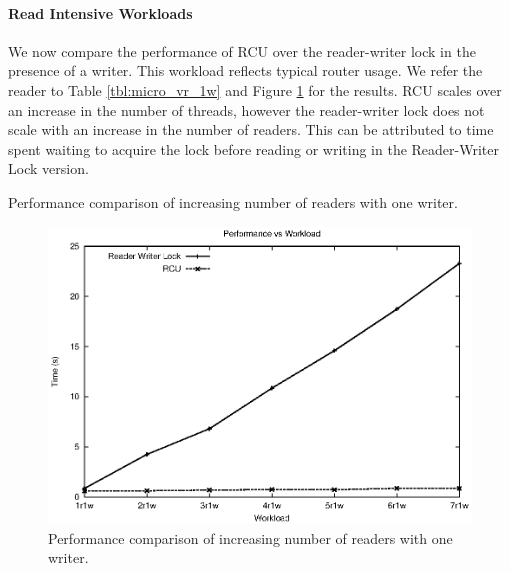 \documentclass[a4paper]{article}
\begin{document}
\paragraph{Read Intensive Workloads}
We now compare the performance of RCU over the reader-writer lock in the presence of a writer. This workload reflects typical router usage. We refer the reader to Table \ref{tbl:micro_vr_1w} and Figure \ref{img:micro_vr_1w} for the results.
RCU scales over an increase in the number of threads, however the reader-writer lock does not scale with an increase in the number of readers. This can be attributed to time spent waiting to acquire the lock before reading or writing in the Reader-Writer Lock version.

\begin{table}[tph]
\begin{center}

\end{center}
\label{tbl:micro_vr_1w}
\caption{Performance comparison of increasing number of readers with one writer.}
\end{table}

\begin{figure}[tph]
\begin{center}
\includegraphics[scale = 0.7]{../images/graphs/micro_vr_1w}
\caption{Performance comparison of increasing number of readers with one writer.}
\label{img:micro_vr_1w}
\end{center}
\end{figure}
\end{document}
